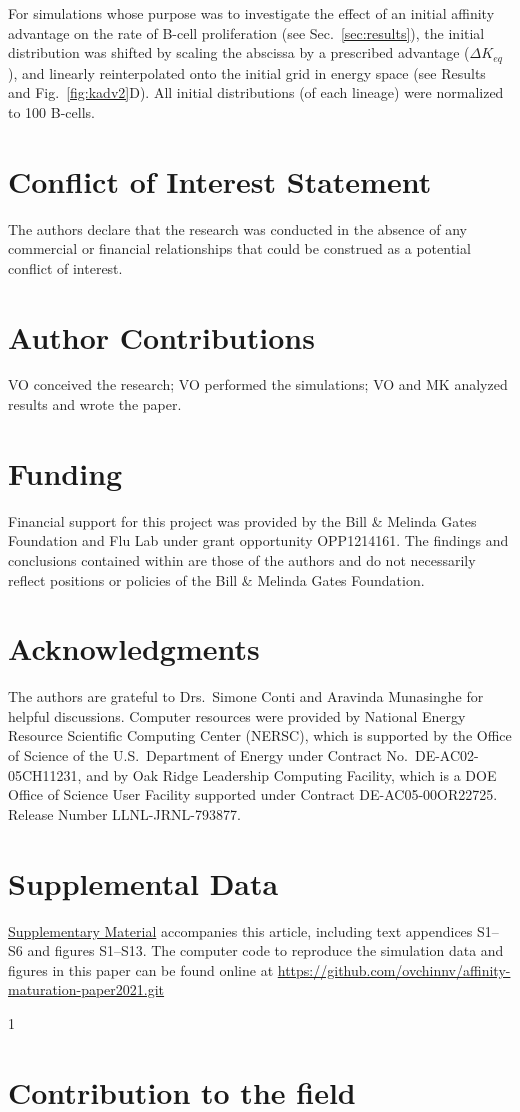 \documentclass[utf8]{frontiersHLTH}%
\def\significance{1}
\newcommand{\mk}[1]{} %
\newcommand{\fig}[1]{Fig.~\ref{fig:#1}}
\newcommand{\Sec}[1]{Sec.~\ref{sec:#1}}
\renewcommand{\sec}[1]{\Sec{#1}}
\begin{document}
For simulations whose purpose was to investigate the
effect of an initial affinity advantage on the rate of B-cell
proliferation (see \sec{results}), the initial distribution was shifted by scaling the
abscissa by a prescribed advantage ($\Delta K_{eq}$), {\mk{[kappa should be
superscript]}} and linearly
reinterpolated onto the initial grid in energy space (see Results and \fig{kadv2}D). All
initial distributions (of each lineage) were normalized to 100 B-cells.


\section*{Conflict of Interest Statement}
The authors declare that the research was conducted in the absence of any
commercial or financial relationships that could be construed as a
potential conflict of interest.
%
\section*{Author Contributions}
VO conceived the research;
VO performed the simulations;
VO and MK analyzed results and wrote the paper.
%
\section*{Funding}
Financial support for this project was provided by the Bill \& Melinda
Gates Foundation and Flu Lab under grant opportunity OPP1214161. The
findings and conclusions contained within are those of the authors and do
not necessarily reflect positions or policies of the Bill \& Melinda Gates
Foundation.
\section*{Acknowledgments}
The authors are grateful to Drs.~Simone Conti and Aravinda Munasinghe
for helpful discussions.
Computer resources were provided by National Energy Resource Scientific
Computing Center (NERSC), which is supported by the Office of Science of
the U.S.~Department of Energy under Contract No.~DE-AC02-05CH11231, and
by Oak Ridge Leadership Computing Facility, which is a DOE Office of
Science User Facility supported under Contract DE-AC05-00OR22725. Release
Number LLNL-JRNL-793877.

\section*{Supplemental Data}
\href{http://home.frontiersin.org/about/author-guidelines#SupplementaryMaterial}{Supplementary Material}
accompanies this article, including text appendices S1--S6 and figures S1--S13.
The computer code to reproduce the simulation data and figures in this paper can be found online at \url{https://github.com/ovchinnv/affinity-maturation-paper2021.git}




\clearpage
\ifx\significance\undefined
\else
\if\significance1
\section*{Contribution to the field}
\noindent

\fi
\fi
%
\end{document}
